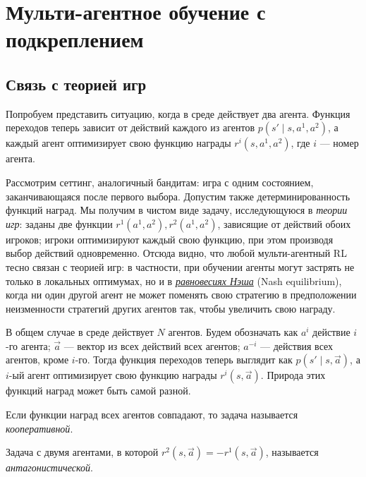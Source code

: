 \section{Мульти-агентное обучение с подкреплением}

\subsection{Связь с теорией игр}

Попробуем представить ситуацию, когда в среде действует два агента. Функция переходов теперь зависит от действий каждого из агентов $p(s' \mid s, a^1, a^2)$, а каждый агент оптимизирует свою функцию награды $r^i(s, a^1, a^2)$, где $i$ --- номер агента.

Рассмотрим сеттинг, аналогичный бандитам: игра с одним состоянием, заканчивающаяся после первого выбора. Допустим также детерминированность функций наград. Мы получим в чистом виде задачу, исследующуюся в \emph{теории игр}: заданы две функции $r^1(a^1, a^2), r^2(a^1, a^2)$, зависящие от действий обоих игроков; игроки оптимизируют каждый свою функцию, при этом производя выбор действий одновременно. Отсюда видно, что любой мульти-агентный RL тесно связан с теорией игр: в частности, при обучении агенты могут застрять не только в локальных оптимумах, но и в \href{https://ru.wikipedia.org/wiki/\%D0\%A0\%D0\%B0\%D0\%B2\%D0\%BD\%D0\%BE\%D0\%B2\%D0\%B5\%D1\%81\%D0\%B8\%D0\%B5_\%D0\%9D\%D1\%8D\%D1\%88\%D0\%B0}{\emph{равновесиях Нэша}} (Nash equilibrium), когда ни один другой агент не может поменять свою стратегию в предположении неизменности стратегий других агентов так, чтобы увеличить свою награду.

В общем случае в среде действует $N$ агентов. Будем обозначать как $a^i$ действие $i$-го агента; $\vec{a}$ --- вектор из всех действий всех агентов; $a^{-i}$ --- действия всех агентов, кроме $i$-го. Тогда функция переходов теперь выглядит как $p(s' \mid s, \vec{a})$, а $i$-ый агент оптимизирует свою функцию награды $r^i(s, \vec{a})$. Природа этих функций наград может быть самой разной.

\begin{definition}
Если функции наград всех агентов совпадают, то задача называется \emph{кооперативной}.
\end{definition}

\begin{definition}
Задача с двумя агентами, в которой $r^2(s, \vec{a}) = -r^1(s, \vec{a})$, называется \emph{антагонистической}.
\end{definition}

